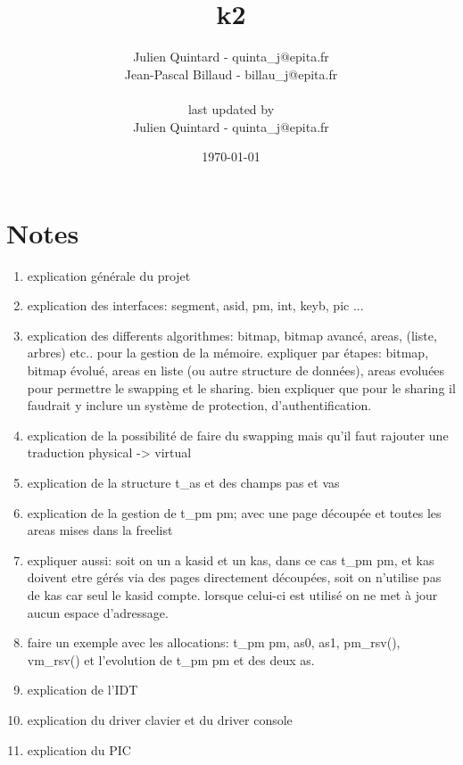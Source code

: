 \documentclass[10pt,a4wide]{article}
\title{k2}
\author{Julien Quintard - \small{quinta\_j@epita.fr} \\
        Jean-Pascal Billaud - \small{billau\_j@epita.fr} \\ \\
	\small{last updated by} \\
	Julien Quintard - \small{quinta\_j@epita.fr}}
\date{\today}
\begin{document}
\maketitle

\section{Notes}

\begin{enumerate}

\item explication g\'en\'erale du projet

\item explication des interfaces: segment, asid, pm, int, keyb, pic ...

\item explication des differents algorithmes: bitmap, bitmap avanc\'e,
      areas, (liste, arbres) etc.. pour la gestion de la m\'emoire. expliquer
      par \'etapes: bitmap, bitmap \'evolu\'e, areas en liste (ou autre
      structure de donn\'ees), areas evolu\'ees pour permettre le swapping
      et le sharing. bien expliquer que pour le sharing il faudrait y
      inclure un syst\`eme de protection, d'authentification.

\item explication de la possibilit\'e de faire du swapping mais qu'il
      faut rajouter une traduction physical -> virtual

\item explication de la structure t\_as et des champs pas et vas

\item explication de la gestion de t\_pm pm; avec une page d\'ecoup\'ee
      et toutes les areas mises dans la freelist

\item expliquer aussi: soit on un a kasid et un kas, dans ce cas t\_pm pm,
      et kas doivent etre g\'er\'es via des pages directement d\'ecoup\'ees,
      soit on n'utilise pas de kas car seul le kasid compte. lorsque celui-ci
      est utilis\'e on ne met \`a jour aucun espace d'adressage.

\item faire un exemple avec les allocations: t\_pm pm, as0, as1, pm\_rsv(),
      vm\_rsv() et l'evolution de t\_pm pm et des deux as.

\item explication de l'IDT

\item explication du driver clavier et du driver console

\item explication du PIC

\end{enumerate}
\end{document}
